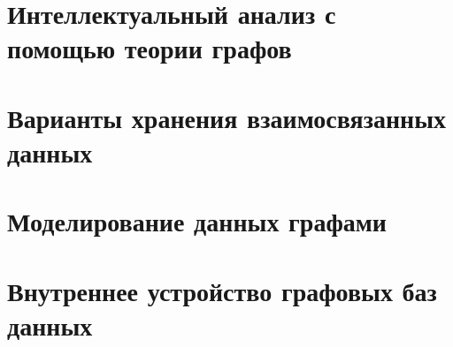 \section{Интеллектуальный анализ с помощью теории графов}



\section{Варианты хранения взаимосвязанных данных}



\section{Моделирование данных графами}



\section{Внутреннее устройство графовых баз данных}






